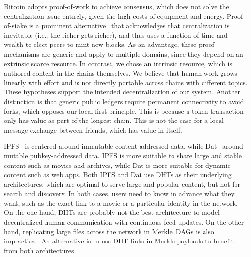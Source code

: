 \documentclass[10pt,journal,compsoc]{IEEEtran}
\begin{document}
Bitcoin adopts proof-of-work to achieve consensus, which does not solve the
centralization issue entirely, given the high costs of equipment and energy.
Proof-of-stake is a prominent alternative~\cite{p2p.proofs} that acknowledges
that centralization is inevitable (i.e., the richer gets richer), and thus uses
a function of time and wealth to elect peers to mint new blocks.
As an advantage, these proof mechanisms are generic and apply to multiple
domains, since they depend on an extrinsic scarce resource.
%
In contrast, we chose an intrinsic resource, which is authored content in the
chains themselves.
We believe that human work grows linearly with effort and is not directly
portable across chains with different topics.
These hypotheses support the intended decentralization of our system.
%
Another distinction is that generic public ledgers require permanent
connectivity to avoid forks, which opposes our local-first principle.
This is because a token transaction only has value as part of the longest
chain.
This is not the case for a local message exchange between friends, which has
value in itself.

IPFS~\cite{p2p.ipfs} is centered around immutable content-addressed data, while
Dat~\cite{p2p.dat} around mutable pubkey-addressed data.
IPFS is more suitable to share large and stable content such as movies and
archives, while Dat is more suitable for dynamic content such as web apps.
%
Both IPFS and Dat use DHTs as their underlying architectures, which are optimal
to serve large and popular content, but not for search and discovery.
In both cases, users need to know in advance what they want, such as the exact
link to a movie or a particular identity in the network.
%
On the one hand, DHTs are probably not the best architecture to model
decentralized human communication with continuous feed updates.
On the other hand, replicating large files across the network in Merkle~DAGs is
also impractical.
An alternative is to use DHT links in Merkle payloads to benefit from both
architectures.
\end{document}
